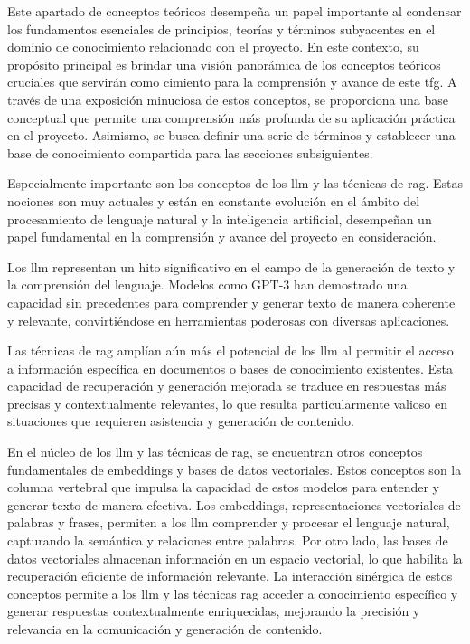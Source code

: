 
Este apartado de conceptos teóricos desempeña un papel importante al condensar los fundamentos esenciales de principios, teorías y términos subyacentes en el dominio de conocimiento relacionado con el proyecto. En este contexto, su propósito principal es brindar una visión panorámica de los conceptos teóricos cruciales que servirán como cimiento para la comprensión y avance de este \acrlong{tfg}. A través de una exposición minuciosa de estos conceptos, se proporciona una base conceptual que permite una comprensión más profunda de su aplicación práctica en el proyecto. Asimismo, se busca definir una serie de términos y establecer una base de conocimiento compartida para las secciones subsiguientes.

Especialmente importante son los conceptos de los \acrfull{llm} y las técnicas de \acrfull{rag}. Estas nociones son muy actuales y están en constante evolución en el ámbito del procesamiento de lenguaje natural y la inteligencia artificial, desempeñan un papel fundamental en la comprensión y avance del proyecto en consideración.

Los \acrshort{llm} representan un hito significativo en el campo de la generación de texto y la comprensión del lenguaje. Modelos como GPT-3 han demostrado una capacidad sin precedentes para comprender y generar texto de manera coherente y relevante, convirtiéndose en herramientas poderosas con diversas aplicaciones.

Las técnicas de \acrshort{rag} amplían aún más el potencial de los \acrshort{llm} al permitir el acceso a información específica en documentos o bases de conocimiento existentes. Esta capacidad de recuperación y generación mejorada se traduce en respuestas más precisas y contextualmente relevantes, lo que resulta particularmente valioso en situaciones que requieren asistencia y generación de contenido.

En el núcleo de los \acrshort{llm} y las técnicas de \acrshort{rag}, se encuentran otros conceptos fundamentales de embeddings y bases de datos vectoriales. Estos conceptos son la columna vertebral que impulsa la capacidad de estos modelos para entender y generar texto de manera efectiva. Los embeddings, representaciones vectoriales de palabras y frases, permiten a los \acrshort{llm} comprender y procesar el lenguaje natural, capturando la semántica y relaciones entre palabras. Por otro lado, las bases de datos vectoriales almacenan información en un espacio vectorial, lo que habilita la recuperación eficiente de información relevante. La interacción sinérgica de estos conceptos permite a los \acrshort{llm} y las técnicas \acrshort{rag} acceder a conocimiento específico y generar respuestas contextualmente enriquecidas, mejorando la precisión y relevancia en la comunicación y generación de contenido.

